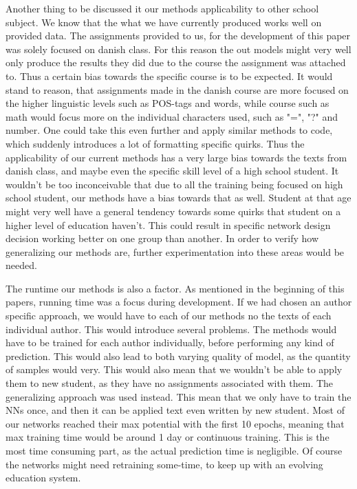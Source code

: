 Another thing to be discussed it our methods applicability to other school
subject. We know that the what we have currently produced works well on provided
data. The assignments provided to us, for the development of this paper was
solely focused on danish class. For this reason the out models might very well
only produce the results they did due to the course the assignment was attached
to. Thus a certain bias towards the specific course is to be expected. It would
stand to reason, that assignments made in the danish course are more focused
on the higher linguistic levels such as POS-tags and words, while course such
as math would focus more on the individual characters used, such as "=", "?"
and number. One could take this even further and apply similar methods to
code, which suddenly introduces a lot of formatting specific quirks. Thus the
applicability of our current methods has a very large bias towards the texts
from danish class, and maybe even the specific skill level of a high school
student. It wouldn't be too inconceivable that due to all the training being
focused on high school student, our methods have a bias towards that as well.
Student at that age might very well have a general tendency towards some quirks
that student on a higher level of education haven't. This could result in
specific network design decision working better on one group than another.
In order to verify how generalizing our methods are, further experimentation
into these areas would be needed.

The runtime our methods is also a factor. As mentioned in the beginning of
this papers, running time was a focus during development. If we had chosen an
author specific approach, we would have to each of our methods no the texts
of each individual author. This would introduce several problems. The methods
would have to be trained for each author individually, before performing any
kind of prediction. This would also lead to both varying quality of model, as
the quantity of samples would very. This would also mean that we wouldn't be
able to apply them to new student, as they have no assignments associated with
them. The generalizing approach was used instead. This mean that we only have
to train the \gls{NN}s once, and then it can be applied text even written by
new student. Most of our networks reached their max potential with the first
10 epochs, meaning that max training time would be around 1 day or continuous
training. This is the most time consuming part, as the actual prediction time is
negligible. Of course the networks might need retraining some-time, to keep up
with an evolving education system.

